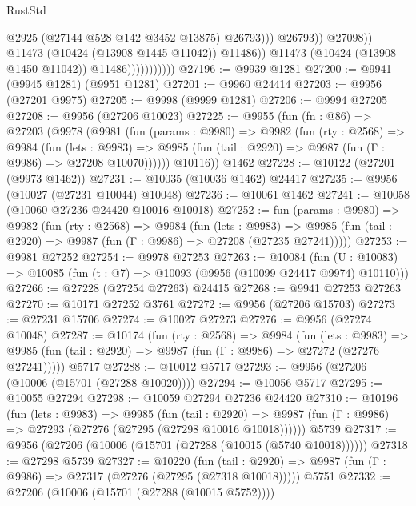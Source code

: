 \begin{lexlean}{RustStd}
\begin{coremodule}
                                            @2925
                                            (@27144 @528 @142 @3452 @13875)
                                            @26793)))
                                      @26793))
                                  @27098))
                              @11473
                              (@10424 (@13908 @1445 @11042))
                              @11486))
                          @11473
                          (@10424 (@13908 @1450 @11042))
                          @11486)))))))))))
@27196 := @9939 @1281
@27200 := @9941 (@9945 @1281) (@9951 @1281)
@27201 := @9960 @24414
@27203 := @9956 (@27201 @9975)
@27205 := @9998 (@9999 @1281)
@27206 := @9994 @27205
@27208 := @9956 (@27206 @10023)
@27225 := @9955
    (fun (fn : @86) =>
    @27203
      (@9978
        (@9981
          (fun (params : @9980) =>
          @9982
            (fun (rty : @2568) =>
            @9984
              (fun (lets : @9983) =>
              @9985 (fun (tail : @2920) => @9987 (fun (Γ : @9986) => @27208 @10070))))))
        @10116))
    @1462
@27228 := @10122 (@27201 (@9973 @1462))
@27231 := @10035 (@10036 @1462) @24417
@27235 := @9956 (@10027 (@27231 @10044) @10048)
@27236 := @10061 @1462
@27241 := @10058 (@10060 @27236 @24420 @10016 @10018)
@27252 := fun (params : @9980) =>
  @9982
    (fun (rty : @2568) =>
    @9984
      (fun (lets : @9983) =>
      @9985 (fun (tail : @2920) => @9987 (fun (Γ : @9986) => @27208 (@27235 @27241)))))
@27253 := @9981 @27252
@27254 := @9978 @27253
@27263 := @10084
    (fun (U : @10083) => @10085 (fun (t : @7) => @10093 (@9956 (@10099 @24417 @9974) @10110)))
@27266 := @27228 (@27254 @27263) @24415
@27268 := @9941 @27253 @27263
@27270 := @10171 @27252 @3761
@27272 := @9956 (@27206 @15703)
@27273 := @27231 @15706
@27274 := @10027 @27273
@27276 := @9956 (@27274 @10048)
@27287 := @10174
    (fun (rty : @2568) =>
    @9984
      (fun (lets : @9983) =>
      @9985 (fun (tail : @2920) => @9987 (fun (Γ : @9986) => @27272 (@27276 @27241)))))
    @5717
@27288 := @10012 @5717
@27293 := @9956 (@27206 (@10006 (@15701 (@27288 @10020))))
@27294 := @10056 @5717
@27295 := @10055 @27294
@27298 := @10059 @27294 @27236 @24420
@27310 := @10196
    (fun (lets : @9983) =>
    @9985
      (fun (tail : @2920) =>
      @9987 (fun (Γ : @9986) => @27293 (@27276 (@27295 (@27298 @10016 @10018))))))
    @5739
@27317 := @9956 (@27206 (@10006 (@15701 (@27288 (@10015 (@5740 @10018))))))
@27318 := @27298 @5739
@27327 := @10220
    (fun (tail : @2920) => @9987 (fun (Γ : @9986) => @27317 (@27276 (@27295 (@27318 @10018)))))
    @5751
@27332 := @27206 (@10006 (@15701 (@27288 (@10015 @5752))))

\end{coremodule}
\end{lexlean}
